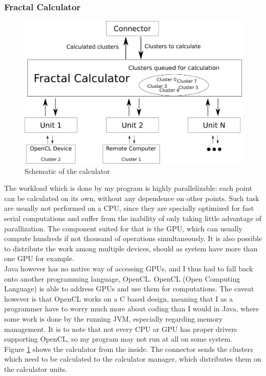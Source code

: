 \documentclass[12pt,a4paper,titlepage]{article}
\begin{document}
	\subsubsection{Fractal Calculator}
	\begin{figure}
		\caption{Schematic of the calculator}
		\label{fig:calculator_schematic}
		\centering
		\includegraphics[width=\textwidth]{res/images/calculator.png}
	\end{figure}
	The workload which is done by my program is highly parallelizable: each point can be calculated on its own, without any dependence on other points. Such task are usually not performed on a CPU, since they are specially optimized for fast serial computations and suffer from the inability of only taking little advantage of parallization. The component suited for that is the GPU, which can usually compute hundreds if not thousand of operations simultaneously. It is also possible to distribute the work among multiple devices, should as system have more than one GPU for example.\\
	Java however has no native way of accessing GPUs, and I thus had to fall back onto another programming language, OpenCL. OpenCL (Open Computing Language) is able to address GPUs and use them for computations. The caveat however is that OpenCL works on a C based design, meaning that I as a programmer have to worry much more about coding than I would in Java, where some work is done by the running JVM, especially regarding memory management. It is to note that not every CPU or GPU has proper drivers supporting OpenCL, so my program may not run at all on some system.\\
	Figure \ref{fig:calculator_schematic} shows the calculator from the inside. The connector sends the clusters which need to be calculated to the calculator manager, which distributes them on the calculator units.
\end{document}
